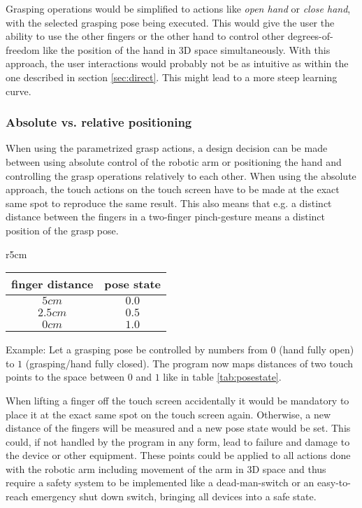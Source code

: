 \documentclass[a4paper]{article}
\begin{document}
Grasping operations would be simplified to actions like \textit{open hand} or \textit{close hand}, with the selected grasping pose being executed. This would give the user the ability to use the other fingers or the other hand to control other degrees-of-freedom like the position of the hand in 3D space simultaneously. With this approach, the user interactions would probably not be as intuitive as within the one described in section \ref{sec:direct}. This might lead to a more steep learning curve.

\subsubsection{Absolute vs. relative positioning}

When using the parametrized grasp actions, a design decision can be made between using absolute control of the robotic arm or positioning the hand and controlling the grasp operations relatively to each other. When using the absolute approach, the touch actions on the touch screen have to be made at the exact same spot to reproduce the same result. This also means that e.g. a distinct distance between the fingers in a two-finger  pinch-gesture means a distinct position of the grasp pose. 

\begin{wraptable}{r}{5cm}
	
	\begin{tabular}{|c|c|}
		\hline
		finger distance&pose state \\
		\hline
		$5cm$&$0.0$ \\
		$2.5cm$&$0.5$ \\
		$0cm$&$1.0$ \\
		\hline
	\end{tabular}
	\caption{Finger distance to pose state mapping (ex.)\label{tab:posestate}}
\end{wraptable}


Example: Let a grasping pose be controlled by numbers from $0$ (hand fully open) to $1$ (grasping/hand fully closed). The program now maps distances of two touch points to the space between $0$ and $1$ like in table \ref{tab:posestate}.

When lifting a finger off the touch screen accidentally it would be mandatory to place it at the exact same spot on the touch screen again. Otherwise, a new distance of the fingers will be measured and a new pose state would be set. This could, if not handled by the program in any form, lead to failure and damage to the device or other equipment. These points could be applied to all actions done with the robotic arm including movement of the arm in 3D space and thus require a safety system to be implemented like a dead-man-switch or an easy-to-reach emergency shut down switch, bringing all devices into a safe state.
\end{document}

